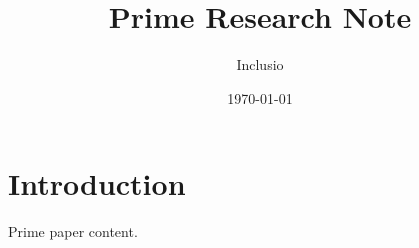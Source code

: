 \documentclass[final,tagged]{pub-prime}
\title{Prime Research Note}
\author{Inclusio}
\date{\today}
\begin{document}
\maketitle

\section{Introduction}
Prime paper content.
\end{document}
